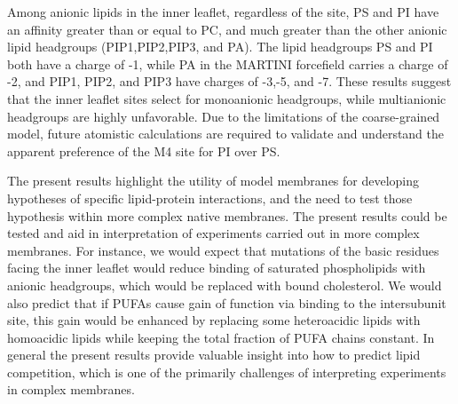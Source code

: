 Among anionic lipids in the inner leaflet, regardless of the site, PS and PI have an affinity greater than or equal to PC, and much greater than the other anionic lipid headgroups (PIP1,PIP2,PIP3, and PA).   The lipid headgroups PS and PI both have a charge of -1, while PA in the MARTINI forcefield\cite{DeJong2012} carries a charge of -2, and PIP1, PIP2, and PIP3 have charges of -3,-5, and -7. These results suggest that the inner leaflet sites select for monoanionic headgroups, while multianionic headgroups are highly unfavorable.  Due to the limitations of the coarse-grained model, future atomistic calculations are required to validate and understand the apparent preference of the M4 site for PI over PS.  %

The present results highlight the utility of model membranes for developing hypotheses of specific lipid-protein interactions, and the need to test those hypothesis within more complex native membranes. The present results could be tested and aid in interpretation of experiments carried out in more complex membranes. For instance, we would expect that mutations of the basic residues facing the inner leaflet would reduce binding of saturated phospholipids with anionic headgroups, which would be replaced with bound cholesterol. We would also predict that if PUFAs cause gain of function via binding to the intersubunit site, this gain would be enhanced by replacing some heteroacidic lipids with homoacidic lipids while keeping the total fraction of PUFA chains constant. In general the present results provide valuable insight into how to predict lipid competition, which is one of the primarily challenges of interpreting experiments in complex membranes.  





